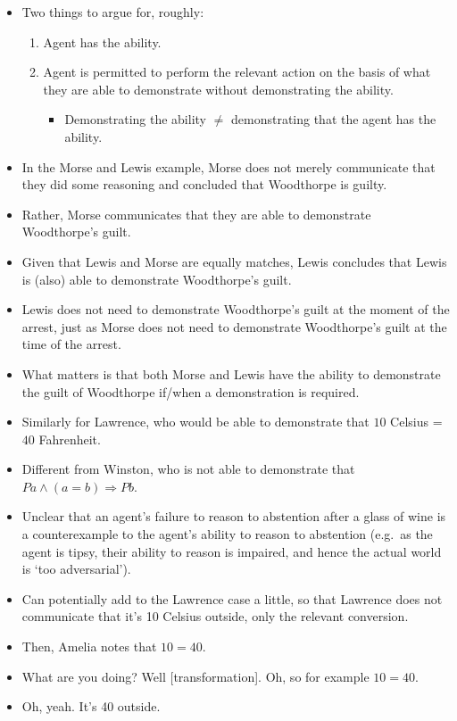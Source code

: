 \documentclass[10pt]{article}
\begin{document}
\begin{itemize}
\item Two things to argue for, roughly:
  \begin{enumerate}
  \item Agent has the ability.
  \item Agent is permitted to perform the relevant action on the basis of what they are able to demonstrate without demonstrating the ability.
    \begin{itemize}
    \item Demonstrating the ability \(\ne\) demonstrating that the agent has the ability.
    \end{itemize}
  \end{enumerate}
\end{itemize}

\begin{itemize}
\item In the Morse and Lewis example, Morse does not merely communicate that they did some reasoning and concluded that Woodthorpe is guilty.
\item Rather, Morse communicates that they are able to demonstrate Woodthorpe's guilt.
\item Given that Lewis and Morse are equally matches, Lewis concludes that Lewis is (also) able to demonstrate Woodthorpe's guilt.
\item Lewis does not need to demonstrate Woodthorpe's guilt at the moment of the arrest, just as Morse does not need to demonstrate Woodthorpe's guilt at the time of the arrest.
\item What matters is that both Morse and Lewis have the ability to demonstrate the guilt of Woodthorpe if/when a demonstration is required.
\item Similarly for Lawrence, who would be able to demonstrate that \(10\) Celsius = \(40\) Fahrenheit.
\item Different from Winston, who is not able to demonstrate that \(Pa \land (a = b) \Rightarrow  Pb\).
\item Unclear that an agent's failure to reason to abstention after a glass of wine is a counterexample to the agent's ability to reason to abstention (e.g.\ as the agent is tipsy, their ability to reason is impaired, and hence the actual world is `too adversarial').
\end{itemize}

\newpage

\begin{itemize}
\item Can potentially add to the Lawrence case a little, so that Lawrence does not communicate that it's 10 Celsius outside, only the relevant conversion.
\item Then, Amelia notes that \(10 = 40\).
\item What are you doing? Well [transformation]. Oh, so for example \(10 = 40\).
\item Oh, yeah. It's 40 outside.
\end{itemize}
\end{document}
